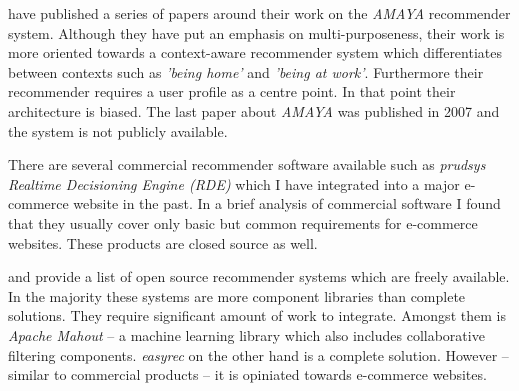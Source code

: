 \citet{rack07} have published a series of papers around their work on the \emph{AMAYA} recommender system. Although they have put an emphasis on multi-purposeness, their work is more oriented towards a context-aware recommender system which differentiates between contexts such as \emph{'being home'} and \emph{'being at work'}. Furthermore their recommender requires a user profile as a centre point. In that point their architecture is biased. The last paper about \emph{AMAYA} was published in 2007 and the system is not publicly available.

There are several commercial recommender software available such as \emph{prudsys Realtime Decisioning Engine (RDE)} which I have integrated into a major e-commerce website in the past. In a brief analysis of commercial software I found that they usually cover only basic but common requirements for e-commerce websites. These products are closed source as well. 

\citet{hahsler11} and \citet{rack07} provide a list of open source recommender systems which are freely available. In the majority these systems are more component libraries than complete solutions. They require significant amount of work to integrate. Amongst them is \emph{Apache Mahout} -- a machine learning library which also includes collaborative filtering components. \emph{easyrec} on the other hand is a complete solution. However -- similar to commercial products -- it is opiniated towards e-commerce websites.